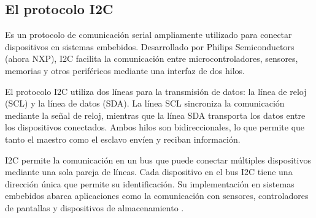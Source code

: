 \subsection{El protocolo I2C}
\label{subsec:I2C}

Es un protocolo de comunicación serial ampliamente utilizado para conectar dispositivos en sistemas embebidos. Desarrollado por Philips Semiconductors (ahora NXP), I2C facilita la comunicación entre microcontroladores, sensores, memorias y otros periféricos mediante una interfaz de dos hilos.

El protocolo I2C utiliza dos líneas para la transmisión de datos: la línea de reloj (SCL) y la línea de datos (SDA). La línea SCL sincroniza la comunicación mediante la señal de reloj, mientras que la línea SDA transporta los datos entre los dispositivos conectados. Ambos hilos son bidireccionales, lo que permite que tanto el maestro como el esclavo envíen y reciban información.

I2C permite la comunicación en un bus que puede conectar múltiples dispositivos mediante una sola pareja de líneas. Cada dispositivo en el bus I2C tiene una dirección única que permite su identificación. Su implementación en sistemas embebidos abarca aplicaciones como la comunicación con sensores, controladores de pantallas y dispositivos de almacenamiento \citep{WEBSITE:i2c}.
